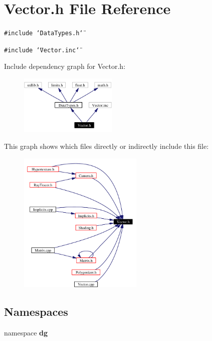 \section{Vector.h File Reference}
\label{Vector_8h}
{\tt \#include \char`\"{}Data\-Types.h\char`\"{}}\par
{\tt \#include \char`\"{}Vector.inc\char`\"{}}\par


Include dependency graph for Vector.h:\begin{figure}[H]
\begin{center}
\leavevmode
\includegraphics[width=131pt]{Vector_8h__incl}
\end{center}
\end{figure}


This graph shows which files directly or indirectly include this file:\begin{figure}[H]
\begin{center}
\leavevmode
\includegraphics[width=168pt]{Vector_8h__dep__incl}
\end{center}
\end{figure}
\subsection*{Namespaces}
\begin{CompactItemize}
\item 
namespace {\bf dg}
\end{CompactItemize}
